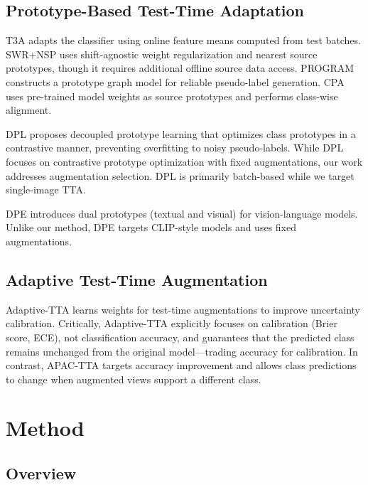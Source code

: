 \documentclass{article}
\begin{document}
\subsection{Prototype-Based Test-Time Adaptation}

T3A \citep{iwasawa2021test} adapts the classifier using online feature means computed from test batches. SWR+NSP \citep{choi2022improving} uses shift-agnostic weight regularization and nearest source prototypes, though it requires additional offline source data access. PROGRAM \citep{sun2024program} constructs a prototype graph model for reliable pseudo-label generation. CPA \citep{lee2024prototypical} uses pre-trained model weights as source prototypes and performs class-wise alignment.

DPL \citep{wang2024decoupled} proposes decoupled prototype learning that optimizes class prototypes in a contrastive manner, preventing overfitting to noisy pseudo-labels. While DPL focuses on contrastive prototype optimization with fixed augmentations, our work addresses augmentation selection. DPL is primarily batch-based while we target single-image TTA.

DPE \citep{zhang2024dual} introduces dual prototypes (textual and visual) for vision-language models. Unlike our method, DPE targets CLIP-style models and uses fixed augmentations.

\subsection{Adaptive Test-Time Augmentation}

Adaptive-TTA \citep{conde2022adaptive} learns weights for test-time augmentations to improve uncertainty calibration. Critically, Adaptive-TTA explicitly focuses on calibration (Brier score, ECE), not classification accuracy, and guarantees that the predicted class remains unchanged from the original model---trading accuracy for calibration. In contrast, APAC-TTA targets accuracy improvement and allows class predictions to change when augmented views support a different class.

\section{Method}

\subsection{Overview}
\end{document}
